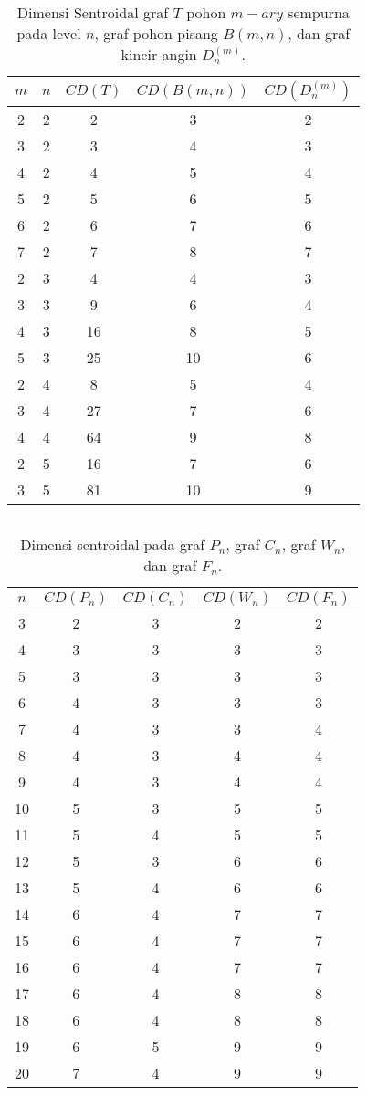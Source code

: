 \begin{table}[h!]
	\centering
	\begin{tabular}{|c|c|c|c|c|}
		\hline
		$m$&$n$&$CD(T)$&$CD(B(m,n))$&$CD(D_n^{(m)})$\\
		\hline 
		2&2&2&3&2\\
		3&2&3&4&3\\
		4&2&4&5&4\\
		5&2&5&6&5\\
		6&2&6&7&6\\
		7&2&7&8&7\\
		2&3&4&4&3\\
		3&3&9&6&4\\
		4&3&16&8&5\\
		5&3&25&10&6\\
		2&4&8&5&4\\
		3&4&27&7&6\\
		4&4&64&9&8\\
		2&5&16&7&6\\
		3&5&81&10&9\\
		\hline
	\end{tabular}
\caption{Dimensi Sentroidal graf $T$ pohon $m-ary$ sempurna pada level $n$, graf pohon pisang $B(m,n)$, dan graf kincir angin $D_n^{(m)}$.}
\end{table}
$ $\\
\begin{table}[h!]
	\centering
	\begin{tabular}{|c|c|c|c|c|}
		\hline
		$n$&$CD(P_n)$&$CD(C_n)$&$CD(W_n)$&$CD(F_n)$\\
		\hline
		3&2&3&2&2\\
		4&3&3&3&3\\
		5&3&3&3&3\\
		6&4&3&3&3\\
		7&4&3&3&4\\
		8&4&3&4&4\\
		9&4&3&4&4\\
		10&5&3&5&5\\
		11&5&4&5&5\\
		12&5&3&6&6\\
		13&5&4&6&6\\
		14&6&4&7&7\\
		15&6&4&7&7\\
		16&6&4&7&7\\
		17&6&4&8&8\\
		18&6&4&8&8\\
		19&6&5&9&9\\
		20&7&4&9&9\\
		\hline
	\end{tabular}
	\caption{Dimensi sentroidal pada graf $P_n$, graf $C_n$, graf $W_n$, dan graf $F_n$.}
\end{table}

